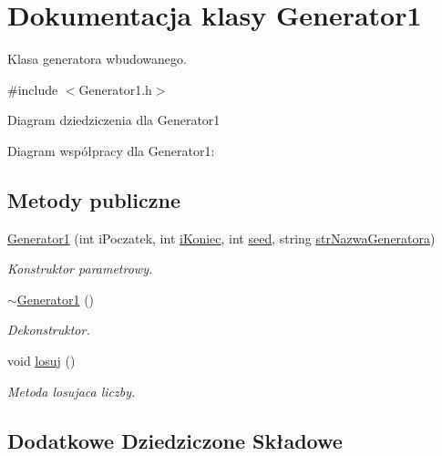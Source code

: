 \hypertarget{classGenerator1}{\section{Dokumentacja klasy Generator1}
\label{classGenerator1}
}


Klasa generatora wbudowanego.  




{\ttfamily \#include $<$Generator1.\+h$>$}



Diagram dziedziczenia dla Generator1


Diagram współpracy dla Generator1\+:
\subsection*{Metody publiczne}
\begin{DoxyCompactItemize}
\item 
\hyperlink{classGenerator1_a872bdaaf9e8bea3527f0e2c6908a7254}{Generator1} (int i\+Poczatek, int \hyperlink{classGenerator_a235b3d02ce62d19e803cc2295eb7911e}{i\+Koniec}, int \hyperlink{classGenerator_ae77446ccb4946b8eb28d0f20f3e4a95f}{seed}, string \hyperlink{classGenerator_a7e2c131c26baf31bb3f072115c619d1c}{str\+Nazwa\+Generatora})
\begin{DoxyCompactList}\small\item\em Konstruktor parametrowy. \end{DoxyCompactList}\item 
\hypertarget{classGenerator1_ad087f9ed8e1630e064f6a0a06e59415c}{\hyperlink{classGenerator1_ad087f9ed8e1630e064f6a0a06e59415c}{$\sim$\+Generator1} ()}\label{classGenerator1_ad087f9ed8e1630e064f6a0a06e59415c}

\begin{DoxyCompactList}\small\item\em Dekonstruktor. \end{DoxyCompactList}\item 
void \hyperlink{classGenerator1_a4b00ed3593e4be47a2101e0a027dfea6}{losuj} ()
\begin{DoxyCompactList}\small\item\em Metoda losujaca liczby. \end{DoxyCompactList}\end{DoxyCompactItemize}
\subsection*{Dodatkowe Dziedziczone Składowe}


